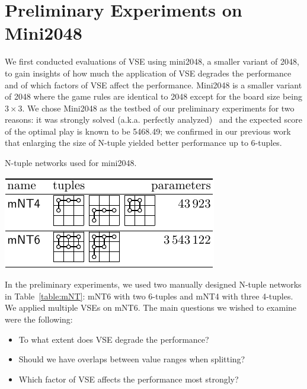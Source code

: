 \section{Preliminary Experiments on Mini2048}


We first conducted evaluations of VSE using mini2048, a smaller variant of 2048, to gain insights of how much the application of VSE degrades the performance and of which factors of VSE affect the performance.
Mini2048 is a smaller variant of 2048 where the game rules are identical to 2048 except for the board size being $3\times 3$.
We chose Mini2048 as the testbed of our preliminary experiments for two reasons: it was strongly solved (a.k.a. perfectly analyzed)~\cite{YaKN22,TeKM23} and the expected score of the optimal play is known to be 5468.49; we confirmed in our previous work~\cite{TeMa25} that enlarging the size of N-tuple yielded better performance up to 6-tuples.


\begin{table}
 \caption{N-tuple networks used for mini2048.}
 \label{table:mNT}
 \centering\includegraphics[]{figures/mNT-table.pdf}
\end{table}

In the preliminary experiments, we used two manually designed N-tuple networks in Table~\ref{table:mNT}: \textsf{mNT6} with two 6-tuples and \textsf{mNT4} with three 4-tuples. We applied multiple VSEs on \textsf{mNT6}.
The main questions we wished to examine were the following:
\begin{itemize}
 \item To what extent does VSE degrade the performance?
 \item Should we have overlaps between value ranges when splitting?
 \item Which factor of VSE affects the performance most strongly?
\end{itemize}


